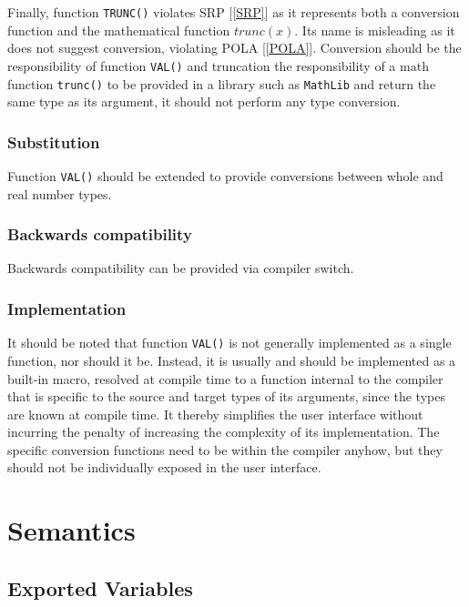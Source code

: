 \documentclass[10pt,a4paper]{article}
\begin{document}
Finally, function \verb|TRUNC()| violates SRP [\ref{SRP}] as it represents
both a conversion function and the mathematical function $trunc(x)$.
Its name is misleading as it does not suggest conversion, violating
POLA [\ref{POLA}]. Conversion should be the responsibility of function
\verb|VAL()| and truncation the responsibility of a math function
\verb|trunc()| to be provided in a library such as \verb|MathLib| and
return the same type as its argument, it should not perform any type
conversion.

\subsubsection{Substitution}

Function \verb|VAL()| should be extended to provide conversions between whole
and real number types.

\subsubsection{Backwards compatibility}

Backwards compatibility can be provided via compiler switch.

\subsubsection{Implementation}
It should be noted that function \verb|VAL()| is not generally implemented as a
single function, nor should it be. Instead, it is usually and should be
implemented as a built-in macro, resolved at compile time to a function
internal to the compiler that is specific to the source and target types of its
arguments, since the types are known at compile time. It thereby simplifies the
user interface without incurring the penalty of increasing the complexity of
its implementation. The specific conversion functions need to be within the
compiler anyhow, but they should not be individually exposed in the user
interface.


\section{Semantics}

\subsection{Exported Variables}
\end{document}
